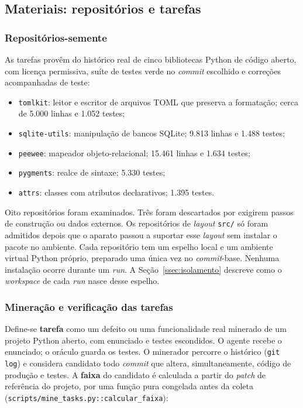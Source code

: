 \subsection{Materiais: repositórios e tarefas}
\label{ssec:materiais}

\subsubsection{Repositórios-semente}

As tarefas provêm do histórico real de cinco bibliotecas Python de código aberto, com licença permissiva, suíte de testes verde no \textit{commit} escolhido e correções acompanhadas de teste:

\begin{itemize}
    \item \texttt{tomlkit}: leitor e escritor de arquivos TOML que preserva a formatação; cerca de 5.000 linhas e 1.052 testes;
    \item \texttt{sqlite-utils}: manipulação de bancos SQLite; 9.813 linhas e 1.488 testes;
    \item \texttt{peewee}: mapeador objeto-relacional; 15.461 linhas e 1.634 testes;
    \item \texttt{pygments}: realce de sintaxe; 5.330 testes;
    \item \texttt{attrs}: classes com atributos declarativos; 1.395 testes.
\end{itemize}

Oito repositórios foram examinados. Três foram descartados por exigirem passos de construção ou dados externos. Os repositórios de \textit{layout} \texttt{src/} só foram admitidos depois que o aparato passou a suportar esse \textit{layout} sem instalar o pacote no ambiente. Cada repositório tem um espelho local e um ambiente virtual Python próprio, preparado uma única vez no \textit{commit}-base. Nenhuma instalação ocorre durante um \textit{run}. A Seção~\ref{ssec:isolamento} descreve como o \textit{workspace} de cada \textit{run} nasce desse espelho.

\subsubsection{Mineração e verificação das tarefas}

Define-se \textbf{tarefa} como um defeito ou uma funcionalidade real minerado de um projeto Python aberto, com enunciado e testes escondidos. O agente recebe o enunciado; o oráculo guarda os testes. O minerador percorre o histórico (\texttt{git log}) e considera candidato todo \textit{commit} que altera, simultaneamente, código de produção e testes. A \textbf{faixa} do candidato é calculada a partir do \textit{patch} de referência do projeto, por uma função pura congelada antes da coleta (\texttt{scripts/mine\_tasks.py::calcular\_faixa}):

